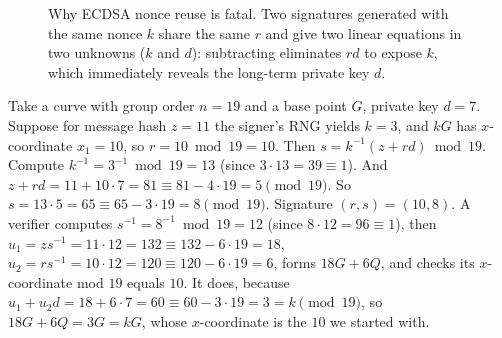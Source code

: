 \begin{figure}[H]
\centering
{}
\caption{Why ECDSA nonce reuse is fatal. Two signatures generated with the same nonce $k$ share the same $r$ and give two linear equations in two unknowns ($k$ and $d$): subtracting eliminates $rd$ to expose $k$, which immediately reveals the long-term private key $d$.}
\label{ch36:fig-nonce-reuse}
\end{figure}

\begin{example}
\label{ch36:ex-ecdsa}
Take a curve with group order $n=19$ and a base point $G$, private key $d=7$. Suppose for message hash $z=11$ the signer's RNG yields $k=3$, and $kG$ has $x$-coordinate $x_1=10$, so $r = 10 \bmod 19 = 10$. Then $s = k^{-1}(z+rd) \bmod 19$. Compute $k^{-1} = 3^{-1} \bmod 19 = 13$ (since $3\cdot13=39\equiv1$). And $z+rd = 11 + 10\cdot7 = 81 \equiv 81 - 4\cdot19 = 5 \pmod{19}$. So $s = 13\cdot5 = 65 \equiv 65 - 3\cdot19 = 8 \pmod{19}$. Signature $(r,s)=(10,8)$. A verifier computes $s^{-1}=8^{-1}\bmod 19 = 12$ (since $8\cdot12=96\equiv1$), then $u_1 = z s^{-1} = 11\cdot12 = 132 \equiv 132-6\cdot19=18$, $u_2 = r s^{-1} = 10\cdot12 = 120 \equiv 120-6\cdot19=6$, forms $18G + 6Q$, and checks its $x$-coordinate mod $19$ equals $10$. It does, because $u_1 + u_2 d = 18 + 6\cdot7 = 60 \equiv 60-3\cdot19 = 3 = k \pmod{19}$, so $18G+6Q = 3G = kG$, whose $x$-coordinate is the $10$ we started with.
\end{example}

